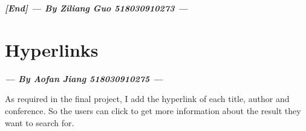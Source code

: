 \documentclass[10pt,twoside,a4paper,titlepage]{article}
\begin{document}






	\textbf{\emph{[End] --- By Ziliang Guo 518030910273 ---}}

\newpage


\section{Hyperlinks}
\textbf{\emph{--- By Aofan Jiang 518030910275 ---}}\newline\par
As required in the final project, I add the hyperlink of each title, author and conference. So the users can click to get more information about the result they want to search for.
\end{document}
